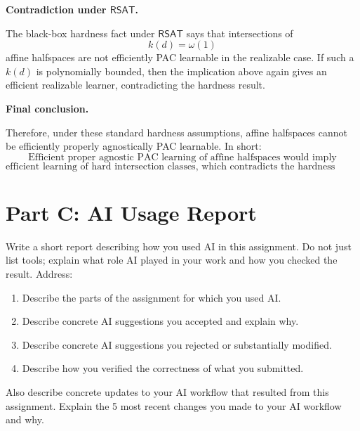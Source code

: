 \documentclass[11pt]{article}
\begin{document}
\begin{enumerate}
\begin{solutionbox}
    \medskip

    \textbf{Contradiction under $\mathsf{RSAT}$.}

    The black-box hardness fact under $\mathsf{RSAT}$ says that intersections of
    \[
    k(d)=\omega(1)
    \]
    affine halfspaces are not efficiently PAC learnable in the realizable case. If such a
    $k(d)$ is polynomially bounded, then the implication above again gives an efficient realizable
    learner, contradicting the hardness result.

    \medskip

    \textbf{Final conclusion.}

    Therefore, under these standard hardness assumptions, affine halfspaces cannot be efficiently
    properly agnostically PAC learnable. In short:
    \[
    \boxed{
    \text{Efficient proper agnostic PAC learning of affine halfspaces would imply}
    }
    \]
    \[
    \boxed{
    \text{efficient learning of hard intersection classes, which contradicts the hardness facts.}
    }
    \]
    \end{solutionbox}
\end{enumerate}

\section{Part C: AI Usage Report}

Write a short report describing how you used AI in this assignment. Do not just list tools; explain what role AI played in your work and how you checked the result. Address:
\begin{enumerate}
    \item Describe the parts of the assignment for which you used AI.
    \item Describe concrete AI suggestions you accepted and explain why.
    \item Describe concrete AI suggestions you rejected or substantially modified.
    \item Describe how you verified the correctness of what you submitted.
\end{enumerate}
Also describe concrete updates to your AI workflow that resulted from this assignment. Explain the 5 most recent changes you made to your AI workflow and why.
\end{document}
